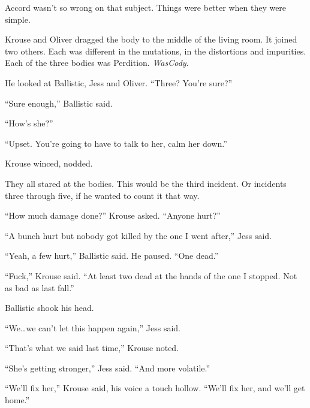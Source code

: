 Accord wasn't so wrong on that subject.  Things were better when they were simple.



Krouse and Oliver dragged the body to the middle of the living room.  It joined two others.  Each was different in the mutations, in the distortions and impurities.  Each of the three bodies was Perdition. \emph{Was}\emph{Cody}.



He looked at Ballistic, Jess and Oliver.  ``Three?  You're sure?''



``Sure enough,'' Ballistic said.



``How's she?''



``Upset.  You're going to have to talk to her, calm her down.''



Krouse winced, nodded.



They all stared at the bodies.  This would be the third incident.  Or incidents three through five, if he wanted to count it that way.



``How much damage done?'' Krouse asked.  ``Anyone hurt?''



``A bunch hurt but nobody got killed by the one I went after,'' Jess said.



``Yeah, a few hurt,'' Ballistic said.  He paused.  ``One dead.''



``Fuck,'' Krouse said.  ``At least two dead at the hands of the one I stopped.  Not as bad as last fall.''



Ballistic shook his head.



``We\ldots we can't let this happen again,'' Jess said.



``That's what we said last time,'' Krouse noted.



``She's getting stronger,'' Jess said.  ``And more volatile.''



``We'll fix her,'' Krouse said, his voice a touch hollow.  ``We'll fix her, and we'll get home.''



